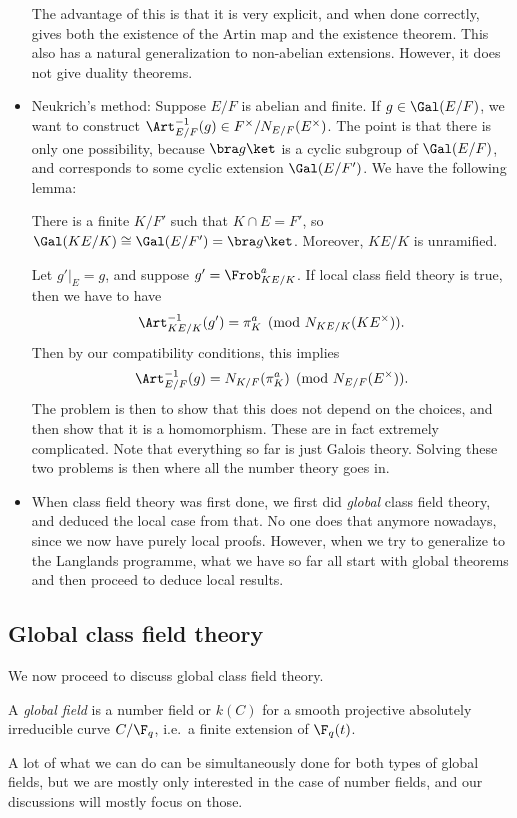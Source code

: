 \documentclass[a4paper]{article}
\begin{document}
\begin{itemize}
    The advantage of this is that it is very explicit, and when done correctly, gives both the existence of the Artin map and the existence theorem. This also has a natural generalization to non-abelian extensions. However, it does not give duality theorems.
  \item Neukrich's method: Suppose $E/F$ is abelian and finite. If $g \in \Gal(E/F)$, we want to construct $\Art_{E/F}^{-1}(g) \in F^\times/N_{E/F}(E^\times)$. The point is that there is only one possibility, because $\bra g\ket$ is a cyclic subgroup of $\Gal(E/F)$, and corresponds to some cyclic extension $\Gal(E/F')$. We have the following lemma:
    \begin{lemma}
      There is a finite $K/F'$ such that $K \cap E = F'$, so $\Gal(KE/K) \cong \Gal(E/F') = \bra g\ket$. Moreover, $KE/K$ is unramified.
    \end{lemma}
    Let $g'|_E = g$, and suppose $g' = \Frob_{KE/K}^a$. If local class field theory is true, then we have to have
    \[
      \Art_{KE/K}^{-1}(g') = \pi_K^a\pmod{N_{KE/K}(KE^\times)}.
    \]
    Then by our compatibility conditions, this implies
    \[
      \Art_{E/F}^{-1}(g) = N_{K/F}(\pi_K^a) \pmod {N_{E/F}(E^\times)}.
    \]
    The problem is then to show that this does not depend on the choices, and then show that it is a homomorphism. These are in fact extremely complicated. Note that everything so far is just Galois theory. Solving these two problems is then where all the number theory goes in.
  \item When class field theory was first done, we first did \emph{global} class field theory, and deduced the local case from that. No one does that anymore nowadays, since we now have purely local proofs. However, when we try to generalize to the Langlands programme, what we have so far all start with global theorems and then proceed to deduce local results.
\end{itemize}

\subsection{Global class field theory}
We now proceed to discuss global class field theory.
\begin{defi}
  A \emph{global field} is a number field or $k(C)$ for a smooth projective absolutely irreducible curve $C/\F_q$, i.e.\ a finite extension of $\F_q(t)$.
\end{defi}
A lot of what we can do can be simultaneously done for both types of global fields, but we are mostly only interested in the case of number fields, and our discussions will mostly focus on those.
\end{document}
